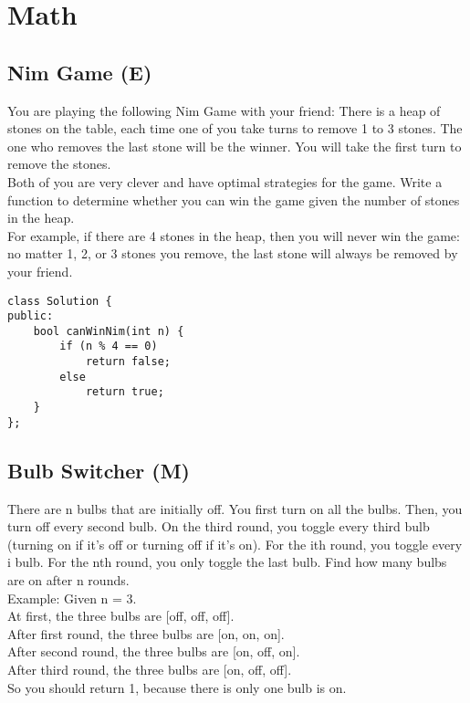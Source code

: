\chapter{Math}


\section{Nim Game (E)}
You are playing the following Nim Game with your friend: There is a heap of stones on the table, each time one of you take turns to remove 1 to 3 stones. The one who removes the last stone will be the winner. You will take the first turn to remove the stones. \\

Both of you are very clever and have optimal strategies for the game. Write a function to determine whether you can win the game given the number of stones in the heap. \\

For example, if there are 4 stones in the heap, then you will never win the game: no matter 1, 2, or 3 stones you remove, the last stone will always be removed by your friend. \\

\begin{lstlisting}
class Solution {
public:
    bool canWinNim(int n) {
        if (n % 4 == 0)
            return false;
        else
            return true;
    }
};
\end{lstlisting}


\section{Bulb Switcher (M)}
There are n bulbs that are initially off. You first turn on all the bulbs. Then, you turn off every second bulb. On the third round, you toggle every third bulb (turning on if it's off or turning off if it's on). For the ith round, you toggle every i bulb. For the nth round, you only toggle the last bulb. Find how many bulbs are on after n rounds. \\

Example:
Given n = 3. \\
At first, the three bulbs are [off, off, off].\\
After first round, the three bulbs are [on, on, on].\\
After second round, the three bulbs are [on, off, on].\\
After third round, the three bulbs are [on, off, off]. \\
So you should return 1, because there is only one bulb is on.\\

